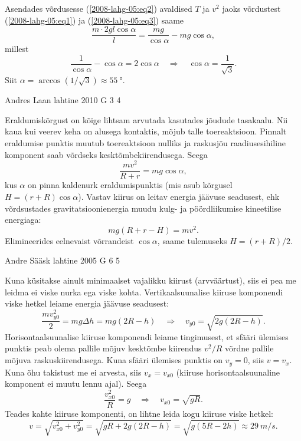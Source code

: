 \documentclass[11pt]{article}
\begin{document}
{{Asendades võrdusesse (\ref{2008-lahg-05:eq2}) avaldised $T$ ja $v^2$
jaoks võrdustest (\ref{2008-lahg-05:eq1}) ja (\ref{2008-lahg-05:eq3}) saame
\[
\frac{m \cdot 2 g l \cos \alpha}{l}=\frac{m g}{\cos \alpha}-m g \cos \alpha,
\]
millest
\[
\frac{1}{\cos \alpha}-\cos \alpha=2 \cos \alpha \quad \Rightarrow\quad \cos \alpha=\frac{1}{\sqrt{3}}.
\]
Siit $\alpha = \arccos \left( 1/ \sqrt 3\right) \approx \SI{55}{\degree}$.
\fi
}

{Andres Laan} %
{lahtine} %
{2010} %
{G 3} %
{4} %
{

\ifSolution
Eraldumiskõrgust on kõige lihtsam arvutada kasutades jõudude tasakaalu. 
Nii kaua kui veerev keha on alusega kontaktis, mõjub talle toereaktsioon. 
Pinnalt eraldumise punktis muutub toereaktsioon nulliks ja raskusjõu raadiusesihiline 
komponent saab võrdseks kesktõmbekiirendusega. Seega
\[
\frac{mv^2}{R+r}=mg\cos\alpha,
\]
kus $\alpha$ on pinna kaldenurk eraldumispunktis (mis asub kõrgusel $H=(r+R)\cos\alpha$). 
Vastav kiirus on leitav energia jäävuse seadusest, ehk
võrdsustades gravitatsioonienergia muudu kulg- ja pöördliikumise kineetilise energiaga:
\[
mg(R+r-H)=mv^2.
\]
Elimineerides eelnevaist võrrandeist $\cos\alpha$, saame tulemuseks $H=(r+R)/2$.
\fi
}

{Andre Sääsk} %
{lahtine} %
{2005} %
{G 6} %
{5} %
{

\ifSolution
Kuna küsitakse ainult minimaalset vajalikku kiirust (arvväärtust), siis ei pea me leidma ei viske nurka ega viske kohta. Vertikaalsuunalise kiiruse komponendi viske hetkel leiame energia jäävuse seadusest:
\[
\frac{m v_{y 0}^{2}}{2}=m g \Delta h=m g(2 R-h) \quad \Rightarrow \quad v_{y 0}=\sqrt{2 g(2 R-h)}.
\]
Horisontaalsuunalise kiiruse komponendi leiame tingimusest, et sfääri ülemises punktis peab olema pallile mõjuv kesktõmbe kiirendus $v^2/R$ võrdne pallile mõjuva raskuskiirendusega. Kuna sfääri ülemises punktis on $v_y = 0$, siis $v = v_x$. Kuna õhu takistust me ei arvesta, siis $v_x = v_{x0}$ (kiiruse horisontaalsuunaline komponent ei muutu lennu ajal). Seega
\[
\frac{v_{x 0}^{2}}{R}=g \quad \Rightarrow \quad v_{x 0}=\sqrt{g R}.
\]
Teades kahte kiiruse komponenti, on lihtne leida kogu kiiruse viske hetkel:
\[
v=\sqrt{v_{x 0}^{2}+v_{y 0}^{2}}=\sqrt{g R+2 g(2 R-h)}=\sqrt{g(5 R-2 h)} \approx \SI{29}{m/s}.
\]

\vspace{0.5\baselineskip}

}}
\end{document}
